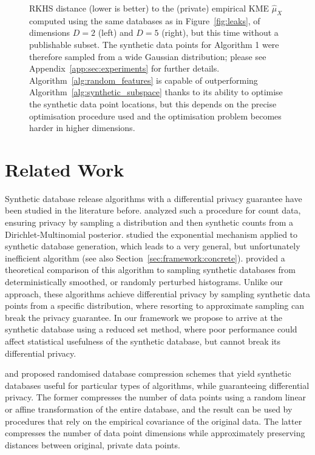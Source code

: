 \documentclass{article}
\theoremstyle{plain}
\theoremstyle{remark}
\theoremstyle{definition}
\begin{document}
\begin{figure}[!t]
\begin{subfigure}{.5\linewidth}
	\end{subfigure}
	\vspace{-0.75em}
	\caption{\small{RKHS distance (lower is better) to the (private) empirical KME $\hat{\mu}_X$ computed using the same databases as in Figure~\ref{fig:leaks}, of dimensions $D = 2$ (left) and $D = 5$ (right), but this time without a publishable subset. The synthetic data points for Algorithm 1 were therefore sampled from a wide Gaussian distribution; please see Appendix~\ref{app:sec:experiments} for further details. Algorithm~\ref{alg:random_features} is capable of outperforming Algorithm~\ref{alg:synthetic_subspace} thanks to its ability to optimise the synthetic data point locations, but this depends on the precise optimisation procedure used and the optimisation problem becomes harder in higher dimensions.}}
	\label{fig:nodata}
\end{figure}



\section{Related Work}
\label{sec:related_work}

Synthetic database release algorithms with a differential privacy guarantee have been studied in the literature before. \citet{machanavajjhala2008privacy} analyzed such a procedure for count data, ensuring privacy by sampling a distribution and then synthetic counts from a Dirichlet-Multinomial posterior. \citet{blum_learning_2008} studied the exponential mechanism applied to synthetic database generation, which leads to a very general, but unfortunately inefficient algorithm (see also Section~\ref{sec:framework:concrete}). \citet{wasserman_statistical_2008} provided a theoretical comparison of this algorithm to sampling synthetic databases from deterministically smoothed, or randomly perturbed histograms. Unlike our approach, these algorithms achieve differential privacy by sampling synthetic data points from a specific distribution, where resorting to approximate sampling can break the privacy guarantee. In our framework we propose to arrive at the synthetic database using a reduced set method, where poor performance could affect statistical usefulness of the synthetic database, but cannot break its differential privacy.

\citet{zhou_differential_2009} and \citet{kenthapadi_privacy_2012} proposed randomised database compression schemes that yield synthetic databases useful for particular types of algorithms, while guaranteeing differential privacy. The former compresses the number of data points using a random linear or affine transformation of the entire database, and the result can be used by procedures that rely on the empirical covariance of the original data. The latter compresses the number of data point dimensions while approximately preserving distances between original, private data points.
\end{document}
